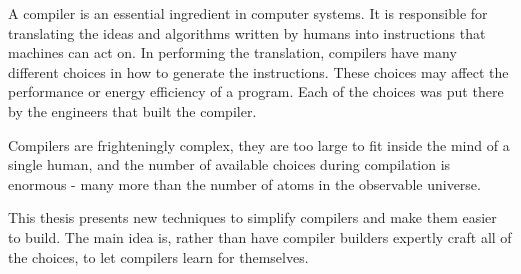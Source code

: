 

A compiler is an essential ingredient in computer systems. It is responsible for translating the ideas and algorithms written by humans into instructions that machines can act on. In performing the translation, compilers have many different choices in how to generate the instructions. These choices may affect the performance or energy efficiency of a program. Each of the choices was put there by the engineers that built the compiler.

Compilers are frighteningly complex, they are too large to fit inside the mind of a single human, and the number of available choices during compilation is enormous - many more than the number of atoms in the observable universe.

This thesis presents new techniques to simplify compilers and make them easier to build. The main idea is, rather than have compiler builders expertly craft all of the choices, to let compilers learn for themselves.
